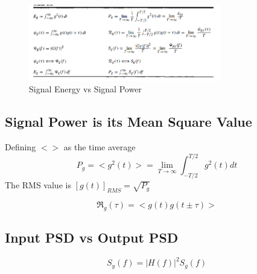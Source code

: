 \documentclass{article}
\begin{document}
    \begin{figure}[h]
        \centering
        \includegraphics[width=0.75\textwidth]{e_v_p}
        \caption{Signal Energy vs Signal Power}
    \end{figure}

    \subsection{Signal Power is its Mean Square Value}
    Defining $< >$ as the time average
    \begin{equation}
        P_g = <g^2(t)> = \lim_{T \rightarrow \infty}\int_{-T/2}^{T/2}g^2(t)dt
    \end{equation}
    The RMS value is $[g(t)]_{RMS} = \sqrt{P_g}$

    \begin{equation}
        \mathfrak{R}_g(\tau) = <g(t)g(t\pm \tau)>
    \end{equation}

    \subsection{Input PSD vs Output PSD}
    \begin{equation}
        S_y(f) = |H(f)|^2S_g(f)
    \end{equation}

    
\end{document}
